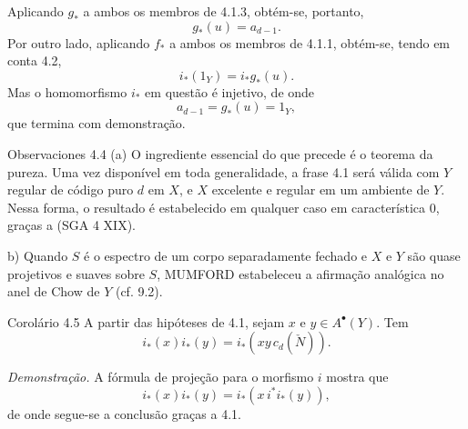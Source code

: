 Aplicando $g_*$ a ambos os membros de 4.1.3, obtém-se, portanto,
\[
g_*(u)=a_{d-1}.
\tag{4.1.6}
\]
Por outro lado, aplicando $f_*$ a ambos os membros de 4.1.1, obtém-se, tendo em conta 4.2,
\[
i_*(1_Y)=i_*g_*(u).
\tag{4.1.7}
\]
Mas o homomorfismo $i_*$ em questão é injetivo, de onde
\[
a_{d-1}=g_*(u)=1_Y,
\]
que termina com demonstração.

\begin{statement}{Observaciones 4.4}
(a) O ingrediente essencial do que precede é o teorema da pureza. Uma vez disponível em toda generalidade, a frase 4.1 será válida com $Y$ regular de código puro $d$ em $X$, e $X$ excelente e regular em um ambiente de $Y$. Nessa forma, o resultado é estabelecido em qualquer caso em característica $0$, graças a (SGA 4 XIX).

b) Quando $S$ é o espectro de um corpo separadamente fechado e $X$ e $Y$ são quase projetivos e suaves sobre $S$, MUMFORD estabeleceu a afirmação analógica no anel de Chow de $Y$ (cf. 9.2).
\end{statement}

\begin{statement}{Corolário 4.5}
A partir das hipóteses de 4.1, sejam $x$ e $y\in A^\bullet(Y)$. Tem
\[
i_*(x)i_*(y)=i_*(xy\,c_d(\check N)).
\]
\end{statement}

\emph{Demonstração.} A fórmula de projeção para o morfismo $i$ mostra que
\[
i_*(x)i_*(y)=i_*(x\,i^*i_*(y)),
\]
de onde segue-se a conclusão graças a 4.1.

